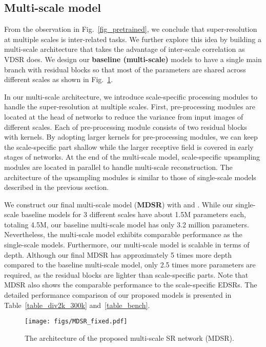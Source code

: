 \documentclass[10pt,twocolumn,letterpaper]{article}
\begin{document}
	\subsection{Multi-scale model}
	\label{sec_3_multi}    
	
	From the observation in Fig.~\ref{fig_pretrained}, we conclude that super-resolution at multiple scales is inter-related tasks.
	We further explore this idea by building a multi-scale architecture that takes the advantage of inter-scale correlation as VDSR \cite{kim2016accurate} does.
	We design our \textbf{baseline (multi-scale)} models to have a single main branch with  residual blocks so that most of the parameters are shared across different scales as shown in Fig.~\ref{fig_model_multi}.
	
	In our multi-scale architecture, we introduce scale-specific processing modules to handle the super-resolution at multiple scales.
	First, pre-processing modules are located at the head of networks to reduce the variance from input images of different scales.
	Each of pre-processing module consists of two residual blocks with  kernels.
	By adopting larger kernels for pre-processing modules, we can keep the scale-specific part shallow while the larger receptive field is covered in early stages of networks.
	At the end of the multi-scale model, scale-specific upsampling modules are located in parallel to handle multi-scale reconstruction.
	The architecture of the upsampling modules is similar to those of single-scale models described in the previous section.
	
	We construct our final multi-scale model (\textbf{MDSR}) with  and .
	While our single-scale baseline models for 3 different scales have about 1.5M parameters each, totaling 4.5M, our baseline multi-scale model has only 3.2 million parameters. Nevertheless, the multi-scale model exhibits comparable performance as the single-scale models. Furthermore, our multi-scale model is scalable in terms of depth. Although our final MDSR has approximately 5 times more depth compared to the baseline multi-scale model, only 2.5 times more parameters are required, as the residual blocks are lighter than scale-specific parts. Note that MDSR also shows the comparable performance to the scale-specific EDSRs. The detailed performance comparison of our proposed models is presented in Table~\ref{table_div2k_300k} and~\ref{table_bench}.
	
\begin{figure}[t]
		\begin{center}
			\texttt{[image: figs/MDSR\_fixed.pdf]}
		\end{center}
\captionsetup{justification=raggedright,singlelinecheck=false}
		\caption{The architecture of the proposed multi-scale SR network (MDSR).}
		\label{fig_model_multi}
	\end{figure}
	
\end{document}
